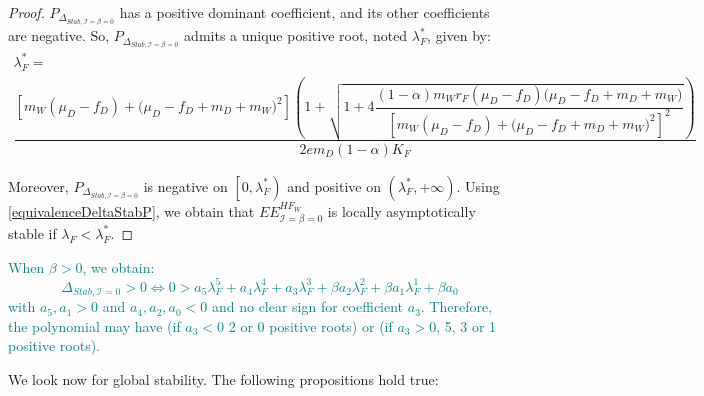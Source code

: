 \documentclass{article}
\newcommand{\lfw}{\lambda_{F}}
\newcommand{\lfw}{\lambda_{F}}
\newcommand{\cI}{\mathcal{I}}
\newcommand{\marc}[1]{\textcolor{teal}{#1}}
\begin{document}
\begin{proof}
$P_{\Delta_{Stab, \cI = \beta = 0}}$ has a positive dominant coefficient, and its other coefficients are negative. So,  $P_{\Delta_{Stab, \cI= \beta = 0}}$ admits a unique positive root, noted $\lfw^*$, given by:
\begin{multline}
\lfw^* = \\
 \dfrac{\left[m_{W}(\mu_{D}-f_{D})+\big(\mu_{D}-f_{D}+m_{D}+m_{W})^{2}\right]\left(1+\sqrt{1+4\dfrac{(1-\alpha)m_{W}r_{F}\left(\mu_{D}-f_{D}\right)\big(\mu_{D}-f_{D}+m_{D}+m_{W})}{\left[m_{W}(\mu_{D}-f_{D})+\big(\mu_{D}-f_{D}+m_{D}+m_{W})^{2}\right]^{2}}}\right)}{2em_D (1-\alpha) K_F }
\end{multline}

Moreover, $P_{\Delta_{Stab, \cI = \beta = 0}}$ is negative on $\left[0, \lfw^* \right)$ and positive on $\left(\lfw ^*, +\infty \right)$. Using \eqref{equivalenceDeltaStabP}, we obtain that $EE^{HF_W}_{\cI = \beta = 0}$ is locally asymptotically stable if $\lfw  < \lfw ^*$.
\end{proof}

\marc{
When $\beta > 0$, we obtain:
\begin{equation*}
\Delta_{Stab, \cI = 0} > 0 \Leftrightarrow 0 > a_5 \lfw ^5 + a_4 \lfw ^4 + a_3 \lfw ^3 + \beta a_2 \lfw ^2 + \beta a_1 \lfw ^1 + \beta a_0
\end{equation*}
with $a_5, a_1 > 0$ and $a_4, a_2, a_0 < 0$ and no clear sign for coefficient $a_3$. Therefore, the polynomial may have (if $a_3<0$ 2 or 0 positive roots) or (if $a_3 > 0$, 5, 3 or 1 positive roots).}

%
%
We look now for global stability. The following propositions hold true:
\end{document}
